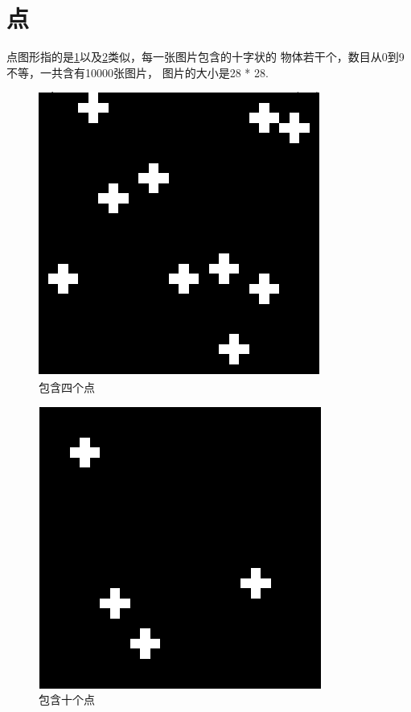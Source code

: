 \section{点}

点图形指的是\ref{star-data-a}以及\ref{star-data-b}类似，每一张图片包含的十字状的
物体若干个，数目从0到9不等，一共含有10000张图片， 图片的大小是28 * 28.

\begin{figure}[!hbt]
    \centering
    \includegraphics[width=0.3\linewidth]{pic/star-data-a.png}
    \caption{包含四个点}
    \label{star-data-a}
\end{figure}

\begin{figure}[!hbt]
    \centering
    \includegraphics[width=0.3\linewidth]{pic/star-data-b.png}
    \caption{包含十个点}
    \label{star-data-b}
\end{figure}

